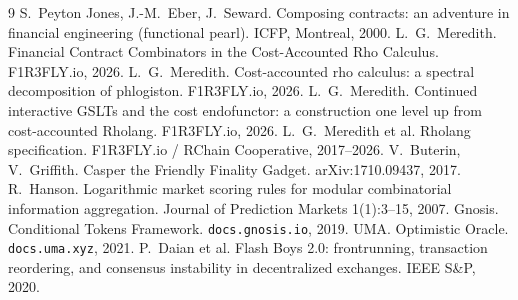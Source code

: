 \documentclass[11pt]{article}
\begin{document}
\begin{thebibliography}{9}
\small
{} S.\ Peyton Jones, J.-M.\ Eber, J.\ Seward. Composing contracts: an adventure in
financial engineering (functional pearl). ICFP, Montreal, 2000.
 L.\ G.\ Meredith. Financial Contract Combinators in the Cost-Accounted Rho
Calculus. F1R3FLY.io, 2026.
 L.\ G.\ Meredith. Cost-accounted rho calculus: a spectral decomposition of
phlogiston. F1R3FLY.io, 2026.
 L.\ G.\ Meredith. Continued interactive GSLTs and the cost endofunctor: a
construction one level up from cost-accounted Rholang. F1R3FLY.io, 2026.
 L.\ G.\ Meredith et al. Rholang specification. F1R3FLY.io / RChain
Cooperative, 2017--2026.
 V.\ Buterin, V.\ Griffith. Casper the Friendly Finality Gadget.
arXiv:1710.09437, 2017.
 R.\ Hanson. Logarithmic market scoring rules for modular combinatorial
information aggregation. Journal of Prediction Markets 1(1):3--15, 2007.
 Gnosis. Conditional Tokens Framework. \texttt{docs.gnosis.io}, 2019.
 UMA. Optimistic Oracle. \texttt{docs.uma.xyz}, 2021.
 P.\ Daian et al. Flash Boys 2.0: frontrunning, transaction reordering, and
consensus instability in decentralized exchanges. IEEE S\&P, 2020.
\end{thebibliography}
\end{document}
